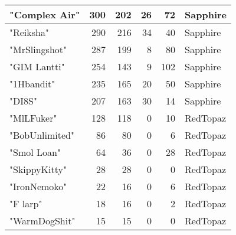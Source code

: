 \documentclass{article}
\begin{document}
\begin{table}[htbp]
\begin{tabular}{|l|r|r|r|r|l|}
"Complex Air" & 300 & 202 & 26 & 72 & Sapphire \\ \hline
"Reiksha" & 290 & 216 & 34 & 40 & Sapphire \\ \hline
"MrSlingshot" & 287 & 199 & 8 & 80 & Sapphire \\ \hline
"GIM Lantti" & 254 & 143 & 9 & 102 & Sapphire \\ \hline
"1Hbandit" & 235 & 165 & 20 & 50 & Sapphire \\ \hline
"DI8S" & 207 & 163 & 30 & 14 & Sapphire \\ \hline
"MlLFuker" & 128 & 118 & 0 & 10 & RedTopaz \\ \hline
"BobUnlimited" & 86 & 80 & 0 & 6 & RedTopaz \\ \hline
"Smol Loan" & 64 & 36 & 0 & 28 & RedTopaz \\ \hline
"SkippyKitty" & 28 & 28 & 0 & 0 & RedTopaz \\ \hline
"IronNemoko" & 22 & 16 & 0 & 6 & RedTopaz \\ \hline
"F larp" & 18 & 16 & 0 & 2 & RedTopaz \\ \hline
"WarmDogShit" & 15 & 15 & 0 & 0 & RedTopaz \\ \hline
\end{tabular}
\end{table}
\end{document}
